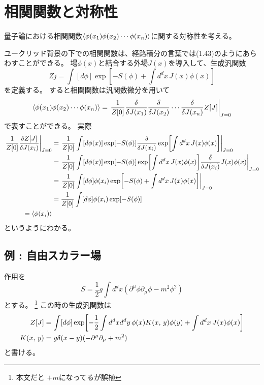 \documentclass[../../master.tex]{subfiles}
\begin{document}
\setcounter{equation}{59}
\section{相関関数と対称性}
量子論における相関関数\(\ev{\phi(x_1)\phi(x_2)\cdots\phi(x_n)}\)に関する対称性を考える。

ユークリッド背景の下での相関関数は、経路積分の言葉では(1.43)のようにあらわすことができる。
場\(\phi(x)\)と結合する外場\(J(x)\)を導入して、生成汎関数
\begin{equation}
    Z{j} = \int [d\phi] \exp[-S(\phi)+\int d^dx\, J(x)\phi(x)]
\end{equation}
を定義する。
すると相関関数は汎関数微分を用いて
\begin{equation}
    \ev{\phi(x_1)\phi(x_2)\cdots\phi(x_n)} = \left. \frac{1}{Z[0]}\fdv{J(x_1)}\fdv{J(x_2)}\cdots\fdv{J(x_n)}Z[J]\right|_{J=0}
\end{equation}
で表すことができる。
実際
\begin{align*}
    \left.\frac{1}{Z[0]}\fdv{Z[J]}{J(x_i)}\right|_{J=0}
    &= \left.\frac{1}{Z[0]}\int [d\phi(x)]\exp[-S(\phi)]\fdv{J(x_i)}\exp[\int d^dx\, J(x)\phi(x)]\right|_{J=0}\\
    &= \left.\frac{1}{Z[0]}\int [d\phi(x)]\exp[-S(\phi)]\exp[\int d^dx\, J(x)\phi(x)]\fdv{J(x_i)}J(x)\phi(x)\right|_{J=0}\\
    &= \left.\frac{1}{Z[0]}\int [d\phi] \phi(x_i)\exp[-S(\phi)+\int d^dx\, J(x)\phi(x)]\right|_{J=0}\\
    &= \frac{1}{Z[0]}\int [d\phi] \phi(x_i)\exp[-S(\phi)]\\
    =\ev{\phi(x_i)}
\end{align*}
というようにわかる。

\subsection*{例 : 自由スカラー場}
作用を
\begin{equation}
    S = \frac{1}{2}g \int d^d x(\partial^\mu\phi\partial_\mu\phi - m^2\phi^2)
\end{equation}
とする。
\footnote{本文だと \(+m\)になってるが誤植}
この時の生成汎関数は
\begin{align}
    Z[J]
    &= \int [d\phi] \exp[-\frac{1}{2}\int d^dx d^d y\, \phi(x)K(x,\,y)\phi(y)+\int d^dx \,J(x)\phi(x)]\notag\\
    K(x,\,y) &= g\delta(x-y)(-\partial^\mu\partial_\mu+m^2)
\end{align}
と書ける。
\end{document}
